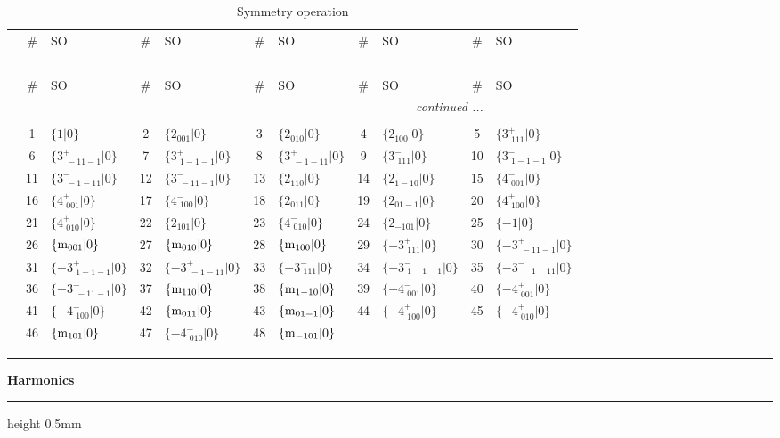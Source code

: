 \documentclass[fleqn,10pt,landscape]{jsarticle}
\begin{document}
\renewcommand{\arraystretch}{1.6}
\begin{longtable}[l]{c|cl|cl|cl|cl|cl}
\captionsetup{justification=raggedright, singlelinecheck=off}
\caption{Symmetry operation}
 \\
 \hline \hline
 & \# & SO & \# & SO & \# & SO & \# & SO & \# & SO \\ \hline \endfirsthead

\multicolumn{10}{l}{\tablename\ \thetable{}} \\
 \hline \hline
 & \# & SO & \# & SO & \# & SO & \# & SO & \# & SO \\ \hline \endhead

 \hline \hline
\multicolumn{10}{r}{\footnotesize\it continued ...} \\ \endfoot

 \hline \hline
\multicolumn{10}{r}{} \\ \endlastfoot

 & 1 & $\{1|0\}$ & 2 & $\{2{}_{001}|0\}$ & 3 & $\{2{}_{010}|0\}$ & 4 & $\{2{}_{100}|0\}$ & 5 & $\{3^{+}_{\,\,111}|0\}$ \\
& 6 & $\{3^{+}_{\,\,-11-1}|0\}$ & 7 & $\{3^{+}_{\,\,1-1-1}|0\}$ & 8 & $\{3^{+}_{\,\,-1-11}|0\}$ & 9 & $\{3^{-}_{\,\,111}|0\}$ & 10 & $\{3^{-}_{\,\,1-1-1}|0\}$ \\
& 11 & $\{3^{-}_{\,\,-1-11}|0\}$ & 12 & $\{3^{-}_{\,\,-11-1}|0\}$ & 13 & $\{2{}_{110}|0\}$ & 14 & $\{2{}_{1-10}|0\}$ & 15 & $\{4^{-}_{\,\,001}|0\}$ \\
& 16 & $\{4^{+}_{\,\,001}|0\}$ & 17 & $\{4^{-}_{\,\,100}|0\}$ & 18 & $\{2{}_{011}|0\}$ & 19 & $\{2{}_{01-1}|0\}$ & 20 & $\{4^{+}_{\,\,100}|0\}$ \\
& 21 & $\{4^{+}_{\,\,010}|0\}$ & 22 & $\{2{}_{101}|0\}$ & 23 & $\{4^{-}_{\,\,010}|0\}$ & 24 & $\{2{}_{-101}|0\}$ & 25 & $\{-1|0\}$ \\
& 26 & $\{{\rm m}_{001}|0\}$ & 27 & $\{{\rm m}_{010}|0\}$ & 28 & $\{{\rm m}_{100}|0\}$ & 29 & $\{-3^{+}_{\,\,111}|0\}$ & 30 & $\{-3^{+}_{\,\,-11-1}|0\}$ \\
& 31 & $\{-3^{+}_{\,\,1-1-1}|0\}$ & 32 & $\{-3^{+}_{\,\,-1-11}|0\}$ & 33 & $\{-3^{-}_{\,\,111}|0\}$ & 34 & $\{-3^{-}_{\,\,1-1-1}|0\}$ & 35 & $\{-3^{-}_{\,\,-1-11}|0\}$ \\
& 36 & $\{-3^{-}_{\,\,-11-1}|0\}$ & 37 & $\{{\rm m}_{110}|0\}$ & 38 & $\{{\rm m}_{1-10}|0\}$ & 39 & $\{-4^{-}_{\,\,001}|0\}$ & 40 & $\{-4^{+}_{\,\,001}|0\}$ \\
& 41 & $\{-4^{-}_{\,\,100}|0\}$ & 42 & $\{{\rm m}_{011}|0\}$ & 43 & $\{{\rm m}_{01-1}|0\}$ & 44 & $\{-4^{+}_{\,\,100}|0\}$ & 45 & $\{-4^{+}_{\,\,010}|0\}$ \\
& 46 & $\{{\rm m}_{101}|0\}$ & 47 & $\{-4^{-}_{\,\,010}|0\}$ & 48 & $\{{\rm m}_{-101}|0\}$ &  &  &  &  \\
\end{longtable}
\vspace{5mm}
\noindent \rule[0.5mm]{5mm}{0.5mm}\hspace{3mm}\textbf{Harmonics}\hspace{3mm}\leaders\hrule height 0.5mm\hfill\kern0pt
\vspace{3mm}
\end{document}
